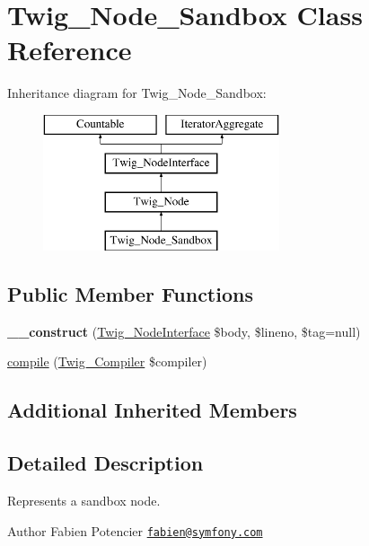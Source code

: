 \hypertarget{classTwig__Node__Sandbox}{}\section{Twig\+\_\+\+Node\+\_\+\+Sandbox Class Reference}
\label{classTwig__Node__Sandbox}
Inheritance diagram for Twig\+\_\+\+Node\+\_\+\+Sandbox\+:\begin{figure}[H]
\begin{center}
\leavevmode
\includegraphics[height=4.000000cm]{classTwig__Node__Sandbox}
\end{center}
\end{figure}
\subsection*{Public Member Functions}
\begin{DoxyCompactItemize}
\item 
{\bfseries \+\_\+\+\_\+construct} (\hyperlink{interfaceTwig__NodeInterface}{Twig\+\_\+\+Node\+Interface} \$body, \$lineno, \$tag=null)\hypertarget{classTwig__Node__Sandbox_a0e2d00fc4bcbb922e9e6aa6de33f9e9a}{}\label{classTwig__Node__Sandbox_a0e2d00fc4bcbb922e9e6aa6de33f9e9a}

\item 
\hyperlink{classTwig__Node__Sandbox_ad82cdbb2e2f28f7123f6fb5571dcd5ea}{compile} (\hyperlink{classTwig__Compiler}{Twig\+\_\+\+Compiler} \$compiler)
\end{DoxyCompactItemize}
\subsection*{Additional Inherited Members}


\subsection{Detailed Description}
Represents a sandbox node.

\begin{DoxyAuthor}{Author}
Fabien Potencier \href{mailto:fabien@symfony.com}{\tt fabien@symfony.\+com} 
\end{DoxyAuthor}


